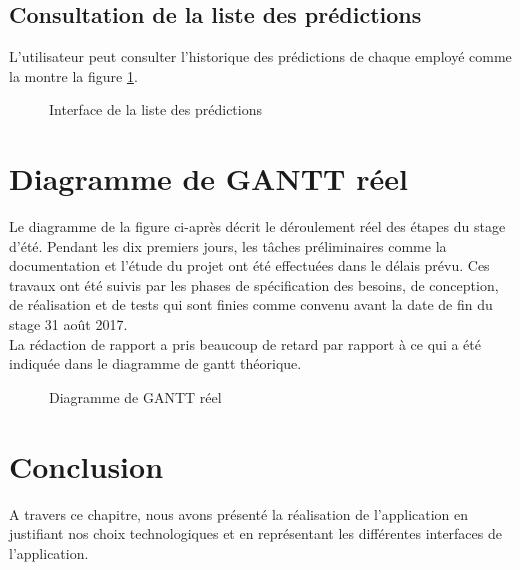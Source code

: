  \subsection{Consultation de la liste des prédictions}
  L’utilisateur peut consulter l’historique des prédictions de chaque employé comme la montre la figure     \ref{fig:Interfacelisteprediction}.
     \begin{figure}[htpb]
    \centering
    \caption{Interface de la liste des prédictions}
    \label{fig:Interfacelisteprediction}
    \end{figure} 
\newpage
    \section{Diagramme de GANTT réel}
   Le diagramme de la figure ci-après décrit le déroulement réel des étapes du stage d'été. Pendant les dix premiers jours, les tâches préliminaires comme la documentation et l’étude  du projet ont été effectuées dans le délais prévu. Ces travaux ont été suivis par les phases de spécification des besoins, de conception, de réalisation et de tests qui sont finies comme convenu avant la date de fin du stage 31 août 2017.\\
    La rédaction de rapport a pris beaucoup de retard par rapport à ce qui a été indiquée dans le diagramme de gantt théorique.
         \begin{figure}[htpb]
\centering
\caption{Diagramme de GANTT réel}
\label{fig:Diagrammeganttreel }
\end{figure}
\section*{Conclusion}
  A travers ce chapitre, nous avons présenté la réalisation de l’application en justifiant nos choix technologiques et en représentant les différentes interfaces de l’application.